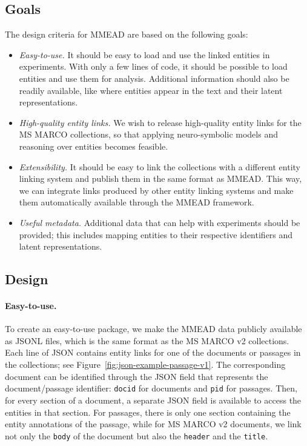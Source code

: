 \subsection{Goals}
The design criteria for MMEAD are based on the following goals:
\begin{itemize}
    \item \emph{Easy-to-use.} It should be easy to load and use the linked entities in experiments. With only a few lines of code, it should be possible to load entities and use them for analysis. Additional information should also be readily available, like where entities appear in the text and their latent representations.
	\item \emph{High-quality entity links.} We wish to release high-quality entity links for the MS MARCO collections, so that applying neuro-symbolic models and reasoning over entities becomes feasible.
	\item \emph{Extensibility.} It should be easy to link the collections with a different entity linking system and publish them in the same format as MMEAD. This way, we can integrate links produced by other entity linking systems and make them automatically available through the MMEAD framework.
	\item \emph{Useful metadata.} Additional data that can help with experiments should be provided; this includes mapping entities to their respective identifiers and latent representations.  
\end{itemize}

\subsection{Design}
\paragraph{Easy-to-use.} To create an easy-to-use package, we make the MMEAD data publicly available as JSONL files, which is the same format as the MS MARCO v2 collections. Each line of JSON contains entity links for one of the documents or passages in the collections; see Figure~\ref{fig:json-example-passage-v1}. The corresponding document can be identified through the JSON field that represents the document/passage identifier: \texttt{docid} for documents and \texttt{pid} for passages. Then, for every section of a document, a separate JSON field is available to access the entities in that section. For passages, there is only one section containing the entity annotations of the passage, while for MS MARCO v2 documents, we link not only the \texttt{body} of the document but also the \texttt{header} and the \texttt{title}.

